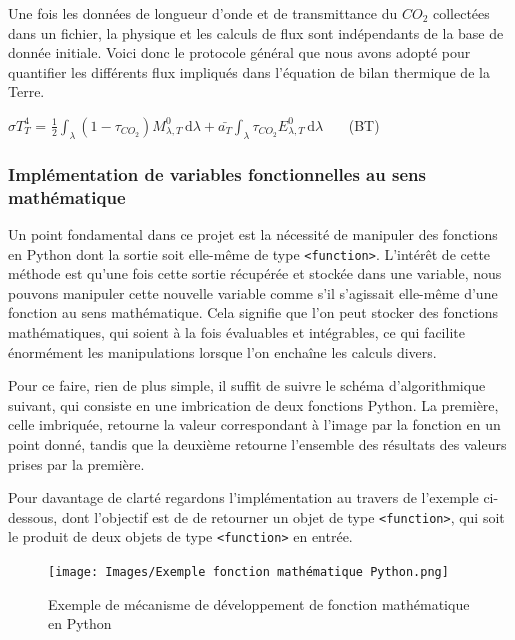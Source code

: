 \documentclass[a4paper, 12pt]{report} %
\newcommand{\figcaptionwithsource}[3]{\caption[#1 
            \newline #2]{#1} \addtocontents{lof}{\protect\vspace{1\baselineskip}}}
\begin{document}
    Une fois les données de longueur d'onde et de transmittance du
$CO_2$ collectées dans un fichier, la physique et les calculs de flux sont indépendants de la base de donnée initiale. Voici donc le protocole général que nous avons adopté pour quantifier les différents flux impliqués dans l'équation de bilan thermique de la Terre.

\begin{center}
$\sigma T_T^4$ = $\frac{1}{2} \int_{\lambda}^{} (1-\tau_{CO_2})M^{0}_{\lambda,T} \, \mathrm{d}\lambda 
                + \bar{a_T} \int_{\lambda}^{} \tau_{CO_2}E^{0}_{\lambda,T} \, \mathrm{d}\lambda$
\ \ \ (BT)
\end{center}

\subsubsection{Implémentation de variables fonctionnelles au sens mathématique}

    \indent Un point fondamental dans ce projet est la nécessité de
manipuler des fonctions en Python dont la sortie soit elle-même de type \texttt{<function>}. L'intérêt de cette méthode est qu'une fois cette sortie récupérée et stockée dans une variable, nous pouvons manipuler cette nouvelle variable comme s'il s'agissait elle-même d'une fonction au sens mathématique. Cela signifie que l'on peut stocker des fonctions mathématiques, qui soient à la fois évaluables et intégrables, ce qui facilite énormément les manipulations lorsque l'on enchaîne les calculs divers. \vspace{\baselineskip}

    \indent Pour ce faire, rien de plus simple, il suffit de suivre le
schéma d'algorithmique suivant, qui consiste en une imbrication de deux fonctions Python. La première, celle imbriquée, retourne la valeur correspondant à l'image par la fonction en un point donné, tandis que la deuxième retourne l'ensemble des résultats des valeurs prises par la première. \vspace{\baselineskip}

    \indent Pour davantage de clarté regardons l'implémentation au
travers de l'exemple ci-dessous, dont l'objectif est de de retourner un objet de type \texttt{<function>}, qui soit le produit de deux objets de type \texttt{<function>} en entrée.

\begin{figure}[h]
    \begin{center}
    \texttt{[image: Images/Exemple fonction mathématique Python.png]}
    \figcaptionwithsource{Exemple de mécanisme de développement de fonction mathématique en Python}{\textit{Python 3.12}}{fig:figure1}
    \label{fig:figure1}
    \end{center} 
\end{figure}
\end{document}
